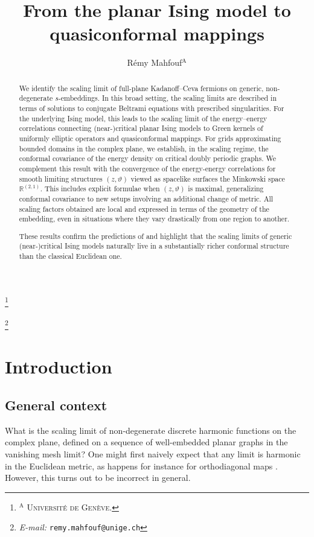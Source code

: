 \documentclass[reqno]{amsart}
\numberwithin{equation}{section}
\theoremstyle{definition}
\theoremstyle{remark}
\begin{document}
\title{From the planar Ising model to quasiconformal mappings}

\author[Rémy Mahfouf]{Rémy Mahfouf$^\mathrm{A}$}

\thanks{\textsc{${}^\mathrm{A}$ Université de Genève.}}

\thanks{\emph{E-mail:} \texttt{remy.mahfouf@unige.ch} }


\begin{abstract}
We identify the scaling limit of full-plane Kadanoff–Ceva fermions on generic, non-degenerate $s$-embeddings. In this broad setting, the scaling limits are described in terms of solutions to conjugate Beltrami equations with prescribed singularities. For the underlying Ising model, this leads to the scaling limit of the energy–energy correlations connecting (near-)critical planar Ising models to Green kernels of uniformly elliptic operators and quasiconformal mappings. For grids approximating bounded domains in the complex plane, we establish, in the scaling regime, the conformal covariance of the energy density on critical doubly periodic graphs. We complement this result with the convergence of the energy-energy correlations for smooth limiting structures $(z,\vartheta)$ viewed as spacelike surfaces the Minkowski space $\mathbb{R}^{(2,1)}$. This includes explicit formulae when $(z,\vartheta)$ is maximal, generalizing conformal covariance to new setups involving an additional change of metric. All scaling factors obtained are local and expressed in terms of the geometry of the embedding, even in situations where they vary drastically from one region to another.

These results confirm the predictions of \cite{Che20} and highlight that the scaling limits of generic (near-)critical Ising models naturally live in a substantially richer conformal structure than the classical Euclidean one.
\end{abstract}

\maketitle

\section{Introduction}\label{sec:introduction}


\subsection{General context} 
What is the scaling limit of non-degenerate discrete harmonic functions on the complex plane, defined on a sequence of well-embedded planar graphs in the
vanishing mesh limit? One might first naively expect that any limit is harmonic in the Euclidean metric, as happens for instance for orthodiagonal maps \cite{gurel2020dirichlet}. However, this turns out to be incorrect in general.
\end{document}

